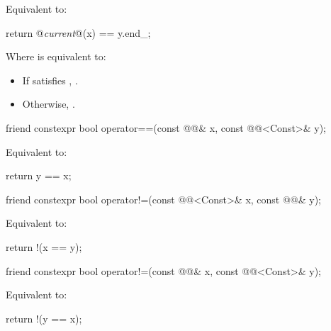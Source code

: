 \begin{itemdescr}
\pnum
\effects Equivalent to:
\begin{codeblock}
return @\textit{current}@(x) == y.end_;
\end{codeblock}

Where  is equivalent to:
\begin{itemize}
\item If  satisfies , .
\item Otherwise, .
\end{itemize}
\end{itemdescr}

%
\begin{itemdecl}
friend constexpr bool operator==(const @@& x, const @@<Const>& y);
\end{itemdecl}

\begin{itemdescr}
\pnum
\effects Equivalent to:
\begin{codeblock}
return y == x;
\end{codeblock}
\end{itemdescr}

%
\begin{itemdecl}
friend constexpr bool operator!=(const @@<Const>& x, const @@& y);
\end{itemdecl}

\begin{itemdescr}
\pnum
\effects Equivalent to:
\begin{codeblock}
return !(x == y);
\end{codeblock}
\end{itemdescr}

%
\begin{itemdecl}
friend constexpr bool operator!=(const @@& x, const @@<Const>& y);
\end{itemdecl}

\begin{itemdescr}
\pnum
\effects Equivalent to:
\begin{codeblock}
return !(y == x);
\end{codeblock}
\end{itemdescr}

